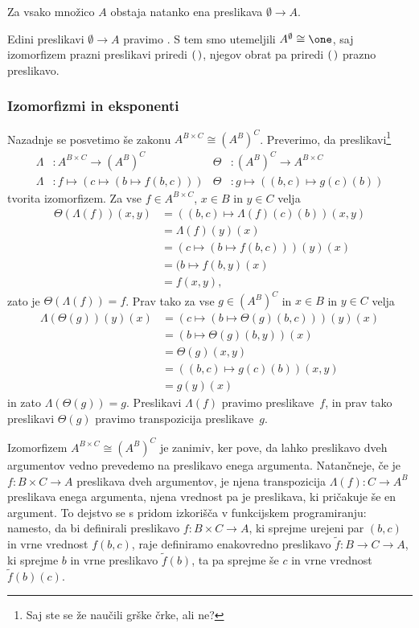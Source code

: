 \begin{trditev}
  Za vsako množico $A$ obstaja natanko ena preslikava $\emptyset \to A$.
\end{trditev}

Edini preslikavi $\emptyset \to A$ pravimo . S tem smo utemeljili
$A^\emptyset \cong \one$, saj izomorfizem prazni preslikavi priredi
$(\,)$, njegov obrat pa priredi $(\,)$ prazno preslikavo.

\subsubsection{Izomorfizmi in eksponenti}
\label{sec:izomorfizmi-in-eksponenti}

Nazadnje se posvetimo še zakonu $A^{B \times C} \cong (A^B)^C$.
Preverimo, da preslikavi\footnote{Saj ste se že naučili grške črke, ali ne?}
%
\begin{align*}
  \Lambda &: A^{B \times C} \to (A^B)^C
  &
  \Theta &: (A^B)^C \to A^{B \times C}
  \\
  \Lambda &: f \mapsto (c \mapsto (b \mapsto f(b, c)))
  &
  \Theta &: g \mapsto ((b, c) \mapsto g(c)(b))
\end{align*}
%
tvorita izomorfizem. Za vse $f \in A^{B \times C}$, $x \in B$ in $y \in C$ velja
%
\begin{align*}
  \Theta(\Lambda(f))(x, y)
  &= ((b, c) \mapsto \Lambda(f)(c)(b)) (x, y)  \\
  &= \Lambda(f)(y)(x) \\
  &= (c \mapsto (b \mapsto f(b, c)))(y)(x) \\
  &= (b \mapsto f(b, y)(x) \\
  &= f(x, y),
\end{align*}
%
zato je $\Theta(\Lambda(f)) = f$. Prav tako za vse $g \in (A^B)^C$ in $x \in B$ in
$y \in C$ velja
%
\begin{align*}
  \Lambda(\Theta(g))(y)(x)
  &= (c \mapsto (b \mapsto \Theta(g)(b, c)))(y)(x) \\
  &= (b \mapsto \Theta(g)(b, y))(x) \\
  &= \Theta(g)(x, y) \\
  &= ((b, c) \mapsto g(c)(b)) (x, y) \\
  &= g(y)(x)
\end{align*}
%
in zato $\Lambda(\Theta(g)) = g$.
%
Preslikavi $\Lambda(f)$ pravimo  preslikave~$f$, in prav tako preslikavi
$\Theta(g)$ pravimo transpozicija preslikave~$g$.

Izomorfizem $A^{B \times C} \cong (A^B)^C$ je zanimiv, ker pove, da lahko preslikavo dveh
argumentov vedno prevedemo na preslikavo enega argumenta. Natančneje, če je
$f : B \times C \to A$ preslikava dveh argumentov, je njena transpozicija
$\Lambda(f) : C \to A^B$ preslikava enega argumenta, njena vrednost pa je preslikava, ki
pričakuje še en argument. To dejstvo se s pridom izkorišča v funkcijskem programiranju:
namesto, da bi definirali preslikavo $f : B \times C \to A$, ki sprejme urejeni par
$(b, c)$ in vrne vrednost $f(b,c)$, raje definiramo enakovredno preslikavo
$\tilde{f} : B \to C \to A$, ki sprejme $b$ in vrne preslikavo $\tilde{f}(b)$, ta pa
sprejme še $c$ in vrne vrednost $\tilde{f}(b)(c)$.


